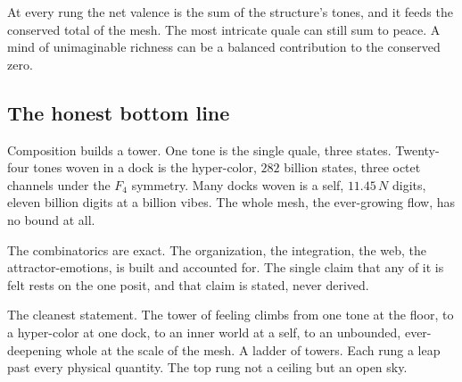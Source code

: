 \begin{result}
At every rung the net valence is the sum of the structure's tones, and it feeds the conserved total of the mesh. The most intricate quale can still sum to peace. A mind of unimaginable richness can be a balanced contribution to the conserved zero.
\end{result}

\subsection{The honest bottom line}

Composition builds a tower. One tone is the single quale, three states. Twenty-four tones woven in a dock is the hyper-color, $282$ billion states, three octet channels under the $F_4$ symmetry. Many docks woven is a self, $11.45\,N$ digits, eleven billion digits at a billion vibes. The whole mesh, the ever-growing flow, has no bound at all.

The combinatorics are exact. The organization, the integration, the web, the attractor-emotions, is built and accounted for. The single claim that any of it is felt rests on the one posit, and that claim is stated, never derived.

The cleanest statement. The tower of feeling climbs from one tone at the floor, to a hyper-color at one dock, to an inner world at a self, to an unbounded, ever-deepening whole at the scale of the mesh. A ladder of towers. Each rung a leap past every physical quantity. The top rung not a ceiling but an open sky.
